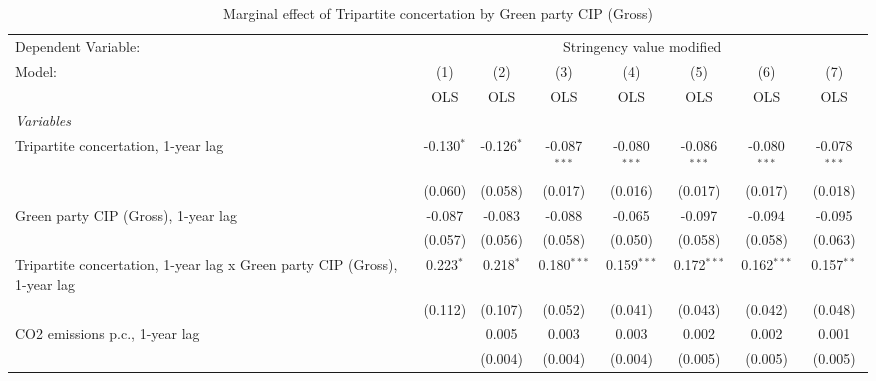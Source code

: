 
\begin{table}[htbp]
   \caption{Marginal effect of Tripartite concertation by Green party CIP (Gross)}
   \centering
   \begin{tabular}{lccccccc}
      \toprule
      Dependent Variable: & \multicolumn{7}{c}{Stringency value modified}\\
      Model:                                                                    & (1)          & (2)          & (3)            & (4)            & (5)            & (6)            & (7)\\  
                                                                                &  OLS         & OLS          & OLS            & OLS            & OLS            & OLS            & OLS\\  
      \midrule
      \emph{Variables}\\
      Tripartite concertation, 1-year lag                                       & -0.130$^{*}$ & -0.126$^{*}$ & -0.087$^{***}$ & -0.080$^{***}$ & -0.086$^{***}$ & -0.080$^{***}$ & -0.078$^{***}$\\   
                                                                                & (0.060)      & (0.058)      & (0.017)        & (0.016)        & (0.017)        & (0.017)        & (0.018)\\   
      Green party CIP (Gross), 1-year lag                                       & -0.087       & -0.083       & -0.088         & -0.065         & -0.097         & -0.094         & -0.095\\   
                                                                                & (0.057)      & (0.056)      & (0.058)        & (0.050)        & (0.058)        & (0.058)        & (0.063)\\   
      Tripartite concertation, 1-year lag x Green party CIP (Gross), 1-year lag & 0.223$^{*}$  & 0.218$^{*}$  & 0.180$^{***}$  & 0.159$^{***}$  & 0.172$^{***}$  & 0.162$^{***}$  & 0.157$^{**}$\\   
                                                                                & (0.112)      & (0.107)      & (0.052)        & (0.041)        & (0.043)        & (0.042)        & (0.048)\\   
      CO2 emissions p.c., 1-year lag                                            &              & 0.005        & 0.003          & 0.003          & 0.002          & 0.002          & 0.001\\   
                                                                                &              & (0.004)      & (0.004)        & (0.004)        & (0.005)        & (0.005)        & (0.005)\\   

\end{tabular}
\end{table}
